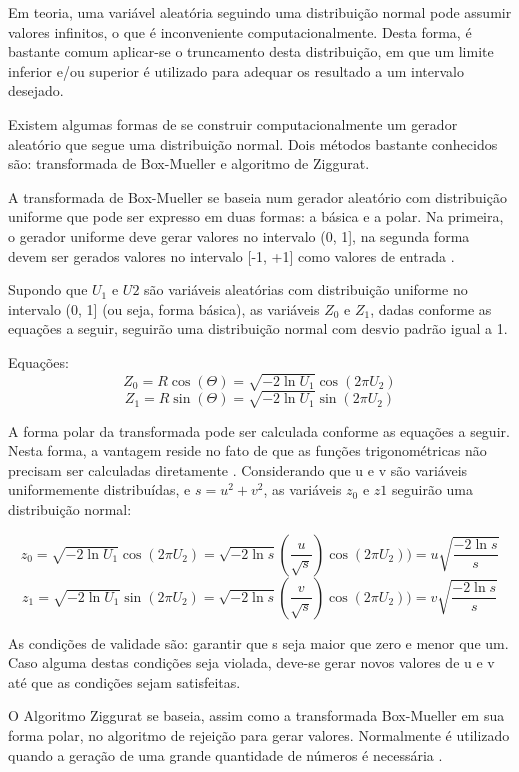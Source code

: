 Em teoria, uma variável aleatória seguindo uma distribuição normal pode assumir valores infinitos, o que é inconveniente computacionalmente. Desta forma, é bastante comum aplicar-se o truncamento desta distribuição, em que um limite inferior e/ou superior é utilizado para adequar os resultado a um intervalo desejado.

Existem algumas formas de se construir computacionalmente um gerador aleatório que segue uma distribuição normal. Dois métodos bastante conhecidos são: transformada de Box-Mueller e algoritmo de Ziggurat.

A transformada de Box-Mueller se baseia num gerador aleatório com distribuição uniforme que pode ser expresso em duas formas: a básica e a polar. Na primeira, o gerador uniforme deve gerar valores no intervalo (0, 1], na segunda forma devem ser gerados valores no intervalo [-1, +1] como valores de entrada \cite{boxmueller}.

Supondo que \(U_{1}\) e \(U{2}\) são variáveis aleatórias com distribuição uniforme no intervalo (0, 1] (ou seja, forma básica), as variáveis \(Z_{0}\) e \(Z_{1}\), dadas conforme as equações a seguir, seguirão uma distribuição normal com desvio padrão igual a 1.

Equações:
\[Z_{0} = R\cos{(\Theta)} = \sqrt{-2\ln{U_{1}}}\cos{(2\pi U_{2})}\]
\[Z_{1} = R\sin{(\Theta)} = \sqrt{-2\ln{U_{1}}}\sin{(2\pi U_{2})}\]

A forma polar da transformada pode ser calculada conforme as equações a seguir. Nesta forma, a vantagem reside no fato de que as funções trigonométricas não precisam ser calculadas diretamente \cite{wikiboxmueller}. Considerando que u e v são variáveis uniformemente distribuídas,  e \(s = u^{2} + v^{2}\), as variáveis \(z_{0}\) e \(z{1}\) seguirão uma distribuição normal:

\[z_{0} = \sqrt{-2\ln{U_{1}}}\cos{(2\pi U_{2})} = \sqrt{-2\ln{s}}(\frac{u}{\sqrt{s}})\cos{(2\pi U_{2})}) = u\sqrt{\frac{-2\ln{s}}{s}}\]
\[z_{1} = \sqrt{-2\ln{U_{1}}}\sin{(2\pi U_{2})} = \sqrt{-2\ln{s}}(\frac{v}{\sqrt{s}})\cos{(2\pi U_{2})}) = v\sqrt{\frac{-2\ln{s}}{s}}\]

As condições de validade são: garantir que s seja maior que zero e menor que um. Caso alguma destas condições seja violada, deve-se gerar novos valores de u e v até que as condições sejam satisfeitas.

O Algoritmo Ziggurat se baseia, assim como a transformada Box-Mueller em sua forma polar, no algoritmo de rejeição para gerar valores. Normalmente é utilizado quando a geração de uma grande quantidade de números é necessária \cite{ziggurat}. 

